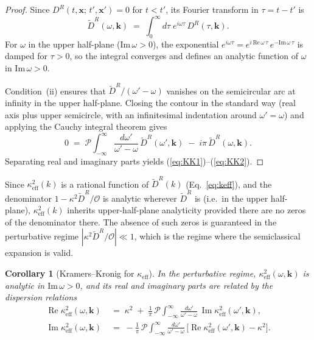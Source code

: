 \documentclass[12pt,a4paper]{article}
\newtheorem{corollary}[theorem]{Corollary}
\begin{document}
\begin{proof}
Since $D^{R}(t,\mathbf{x};\,t',\mathbf{x}')=0$ for $t<t'$, its Fourier transform in $\tau=t-t'$ is
\begin{equation}
  \tilde{D}^{R}(\omega,\mathbf{k})
  \;=\;
  \int_{0}^{\infty}d\tau\;e^{i\omega\tau}\,D^{R}(\tau,\mathbf{k}).
\end{equation}
For $\omega$ in the upper half-plane ($\mathrm{Im}\,\omega>0$), the exponential $e^{i\omega\tau}=e^{i\,\mathrm{Re}\,\omega\,\tau}\,e^{-\mathrm{Im}\,\omega\,\tau}$ is damped for $\tau>0$, so the integral converges and defines an analytic function of $\omega$ in $\mathrm{Im}\,\omega>0$.

Condition~(ii) ensures that $\tilde{D}^{R}/(\omega'-\omega)$ vanishes on the semicircular arc at infinity in the upper half-plane.
Closing the contour in the standard way (real axis plus upper semicircle, with an infinitesimal indentation around $\omega'=\omega$) and applying the Cauchy integral theorem gives
\begin{equation}
  0 \;=\; \mathcal{P}\!\!\int_{-\infty}^{\infty}\frac{d\omega'}{\omega'-\omega}\,\tilde{D}^{R}(\omega',\mathbf{k})
  \;-\; i\pi\,\tilde{D}^{R}(\omega,\mathbf{k}).
\end{equation}
Separating real and imaginary parts yields (\ref{eq:KK1})--(\ref{eq:KK2}).
\end{proof}

\medskip

Since $\kappa_{\mathrm{eff}}^{2}(k)$ is a rational function of $\tilde{D}^{R}(k)$ (Eq.~\ref{eq:keff}), and the denominator $1-\kappa^{2}\tilde{D}^{R}/\mathcal{O}$ is analytic wherever $\tilde{D}^{R}$ is (i.e.\ in the upper half-plane), $\kappa_{\mathrm{eff}}^{2}(k)$ inherits upper-half-plane analyticity provided there are no zeros of the denominator there.
The absence of such zeros is guaranteed in the perturbative regime $|\kappa^{2}\tilde{D}^{R}/\mathcal{O}|\ll 1$, which is the regime where the semiclassical expansion is valid.

\begin{corollary}[Kramers--Kronig for $\kappa_{\mathrm{eff}}$]\label{cor:KKkeff}
In the perturbative regime, $\kappa_{\mathrm{eff}}^{2}(\omega,\mathbf{k})$ is analytic in $\mathrm{Im}\,\omega>0$, and its real and imaginary parts are related by the dispersion relations
\begin{align}
  \operatorname{Re}\kappa_{\mathrm{eff}}^{2}(\omega,\mathbf{k})
  &\;=\;
  \kappa^{2} \;+\; \frac{1}{\pi}\,\mathcal{P}\!\!\int_{-\infty}^{\infty}
  \frac{d\omega'}{\omega'-\omega}\,
  \operatorname{Im}\kappa_{\mathrm{eff}}^{2}(\omega',\mathbf{k}), \label{eq:KKkeff1}\\[6pt]
  \operatorname{Im}\kappa_{\mathrm{eff}}^{2}(\omega,\mathbf{k})
  &\;=\;
  -\frac{1}{\pi}\,\mathcal{P}\!\!\int_{-\infty}^{\infty}
  \frac{d\omega'}{\omega'-\omega}\,
  \bigl[\operatorname{Re}\kappa_{\mathrm{eff}}^{2}(\omega',\mathbf{k})-\kappa^{2}\bigr]. \label{eq:KKkeff2}
\end{align}
\end{corollary}
\end{document}
